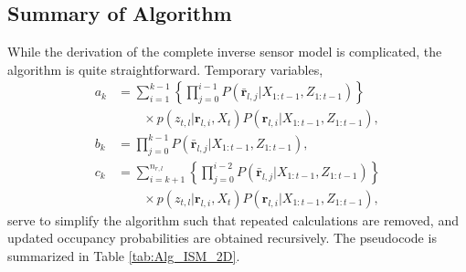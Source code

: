 \documentclass[letterpaper, 10pt, conference]{ieeeconf}
\begin{document}
\subsection{Summary of Algorithm}

While the derivation of the complete inverse sensor model is complicated, the algorithm is quite straightforward.
Temporary variables,
\begin{align*}
a_k&=\sum_{i=1}^{k-1}\left\{\prod_{j=0}^{i-1}P(\bar{\mathbf{r}}_{l,j}|X_{1:t-1},Z_{1:t-1})\right\}\nonumber\\&\quad\quad\times p(z_{t,l}|\mathbf{r}_{l,i},X_t)P(\mathbf{r}_{l,i}|X_{1:t-1},Z_{1:t-1}),
\\
b_k&=\prod_{j=0}^{k-1}P(\bar{\mathbf{r}}_{l,j}|X_{1:t-1},Z_{1:t-1}),
\nonumber\\
c_k&=\sum_{i=k+1}^{n_{r,l}}\left\{\prod_{j=0}^{i-2}P(\bar{\mathbf{r}}_{l,j}|X_{1:t-1},Z_{1:t-1})\right\}\nonumber\\&\quad\quad\times p(z_{t,l}|\mathbf{r}_{l,i},X_t)P(\mathbf{r}_{l,i}|X_{1:t-1},Z_{1:t-1}),
\end{align*}
serve to simplify the algorithm such that repeated calculations are removed, and updated occupancy probabilities are obtained recursively.
The pseudocode is summarized in Table \ref{tab:Alg_ISM_2D}.
\end{document}
